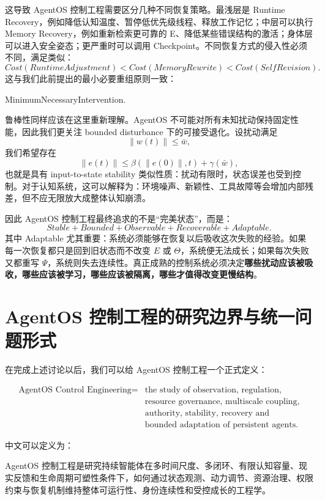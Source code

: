 这导致 AgentOS 控制工程需要区分几种不同恢复策略。最浅层是 Runtime Recovery，例如降低认知温度、暂停低优先级线程、释放工作记忆；中层可以执行 Memory Recovery，例如重新检索更可靠的 E、降低某些错误结构的激活；身体层可以进入安全姿态；更严重时可以调用 Checkpoint。不同恢复方式的侵入性必须不同，满足类似：
\[
Cost(
RuntimeAdjustment
)
<
Cost(
MemoryRewrite
)
<
Cost(
SelfRevision
).
\]
这与我们此前提出的最小必要重组原则一致：
\begin{statementbox}
MinimumNecessaryIntervention.
\end{statementbox}

鲁棒性同样应该在这里重新理解。AgentOS 不可能对所有未知扰动保持固定性能，因此我们更关注 bounded disturbance 下的可接受退化。设扰动满足
\[
\|w(t)\|\le \bar w,
\]
我们希望存在
\[
\|e(t)\|
\le
\beta(
\|e(0)\|,t
)
+
\gamma(\bar w),
\]
也就是具有 input-to-state stability 类似性质：扰动有限时，状态误差也受到控制。对于认知系统，这可以解释为：环境噪声、新颖性、工具故障等会增加内部残差，但不应无限放大成整体认知崩溃。

因此 AgentOS 控制工程最终追求的不是“完美状态”，而是：
\[
\boxed{
Stable
+
Bounded
+
Observable
+
Recoverable
+
Adaptable.
}
\]
其中 Adaptable 尤其重要：系统必须能够在恢复以后吸收这次失败的经验。如果每一次恢复都只是回到旧状态而不改变 $E$ 或 $\Theta$，系统便无法成长；如果每次失败又都重写 $\Psi$，系统则失去连续性。真正成熟的控制系统必须决定\textbf{哪些扰动应该被吸收，哪些应该被学习，哪些应该被隔离，哪些才值得改变更慢结构}。

\section{AgentOS 控制工程的研究边界与统一问题形式}

在完成上述讨论以后，我们可以给 AgentOS 控制工程一个正式定义：

\[
\boxed{
\begin{aligned}
\text{AgentOS Control Engineering}
=
&\text{the study of observation, regulation,}\\
&\text{resource governance, multiscale coupling,}\\
&\text{authority, stability, recovery and}\\
&\text{bounded adaptation of persistent agents.}
\end{aligned}
}
\]

中文可以定义为：

\begin{definition*}
AgentOS 控制工程是研究持续智能体在多时间尺度、多闭环、有限认知容量、现实反馈和生命周期可塑性条件下，如何通过状态观测、动力调节、资源治理、权限约束与恢复机制维持整体可运行性、身份连续性和受控成长的工程学。
\end{definition*}

